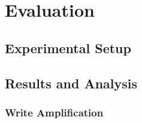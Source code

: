 \chapter{Evaluation}
\label{chap:evaluation}



\section{Experimental Setup}

\section{Results and Analysis}
\subsection*{Write Amplification}

